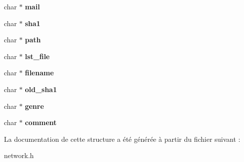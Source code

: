 \begin{DoxyCompactItemize}
\item 
\hypertarget{struct_command__options_af236e8ba7815eda2ff7daf67c80043bb}{char $\ast$ {\bfseries mail}}\label{struct_command__options_af236e8ba7815eda2ff7daf67c80043bb}

\item 
\hypertarget{struct_command__options_ae08c24c84452c09a4d50e1a8ae5d963f}{char $\ast$ {\bfseries sha1}}\label{struct_command__options_ae08c24c84452c09a4d50e1a8ae5d963f}

\item 
\hypertarget{struct_command__options_a44196e6a5696d10442c29e639437196e}{char $\ast$ {\bfseries path}}\label{struct_command__options_a44196e6a5696d10442c29e639437196e}

\item 
\hypertarget{struct_command__options_a73d8ede97b4a863bb11c8225a5c8b70d}{char $\ast$ {\bfseries lst\-\_\-file}}\label{struct_command__options_a73d8ede97b4a863bb11c8225a5c8b70d}

\item 
\hypertarget{struct_command__options_aeac90097f29f7529968697163cea5c18}{char $\ast$ {\bfseries filename}}\label{struct_command__options_aeac90097f29f7529968697163cea5c18}

\item 
\hypertarget{struct_command__options_a43fdab0b6bb94ab25f7a2d2ee003146b}{char $\ast$ {\bfseries old\-\_\-sha1}}\label{struct_command__options_a43fdab0b6bb94ab25f7a2d2ee003146b}

\item 
\hypertarget{struct_command__options_afd39d2a5f0192a3836ea8e6a272430a3}{char $\ast$ {\bfseries genre}}\label{struct_command__options_afd39d2a5f0192a3836ea8e6a272430a3}

\item 
\hypertarget{struct_command__options_a25dae25c3bf9b28d54eb4df7afb2a491}{char $\ast$ {\bfseries comment}}\label{struct_command__options_a25dae25c3bf9b28d54eb4df7afb2a491}

\end{DoxyCompactItemize}


La documentation de cette structure a été générée à partir du fichier suivant \-:\begin{DoxyCompactItemize}
\item 
network.\-h\end{DoxyCompactItemize}
